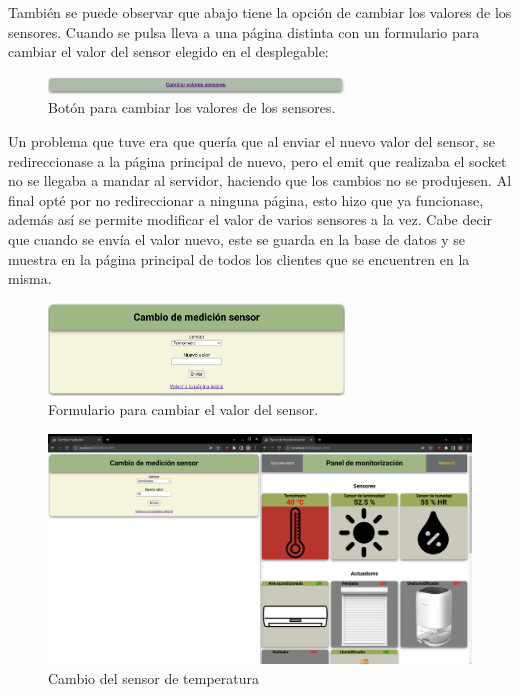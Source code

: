 \documentclass{article}
\begin{document}
También se puede observar que abajo tiene la opción de cambiar los valores de los sensores. Cuando se pulsa lleva a una página distinta con un formulario para cambiar el valor del sensor elegido en el desplegable:

\begin{figure}[H]
    \centering
    \includegraphics[width=0.7\textwidth]{images/cambiarsensor.png}
    \caption{Botón para cambiar los valores de los sensores.}
\end{figure}

Un problema que tuve era que quería que al enviar el nuevo valor del sensor, se redireccionase a la página principal de nuevo, pero el emit que realizaba el socket no se llegaba a mandar al servidor, haciendo que los cambios no se produjesen. Al final opté por no redireccionar a ninguna página, esto hizo que ya funcionase, además así se permite modificar el valor de varios sensores a la vez. Cabe decir que cuando se envía el valor nuevo, este se guarda en la base de datos y se muestra en la página principal de todos los clientes que se encuentren en la misma.

\begin{figure}[H]
    \centering
    \includegraphics[width=0.7\textwidth]{images/form.png}
    \caption{Formulario para cambiar el valor del sensor.}
\end{figure}

\begin{figure}[H]
    \centering
    \includegraphics[width=\textwidth]{images/cambiotemp.png}
    \caption{Cambio del sensor de temperatura}
\end{figure}
\end{document}
